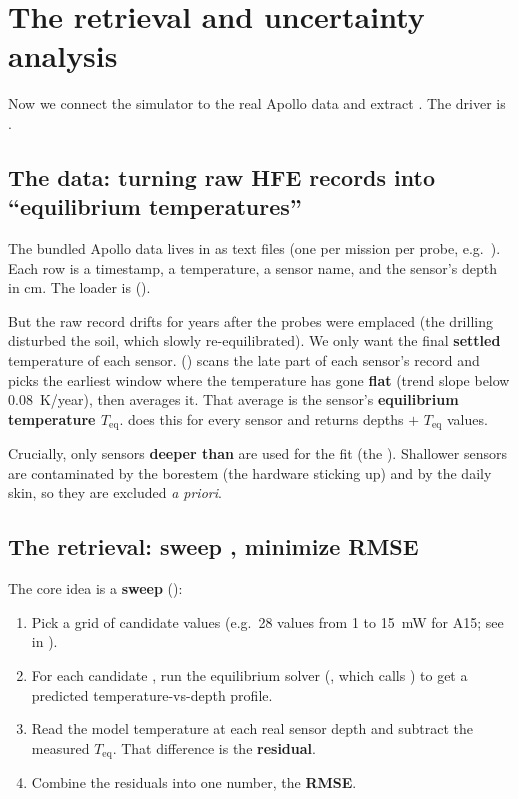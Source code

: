 \section{The \texorpdfstring{\Kd}{Kd} retrieval and uncertainty analysis}
\label{sec:retrieval}

Now we connect the simulator to the real Apollo data and extract \Kd. The driver
is .

\subsection{The data: turning raw HFE records into ``equilibrium temperatures''}
\label{sec:data}

The bundled Apollo data lives in  as  text
files (one per mission per probe, e.g.\ ). Each row is a
timestamp, a temperature, a sensor name, and the sensor's depth in cm. The loader
is  ().

But the raw record drifts for years after the probes were emplaced (the drilling
disturbed the soil, which slowly re-equilibrated). We only want the final
\textbf{settled} temperature of each sensor. 
() scans the late part of each sensor's record and
picks the earliest window where the temperature has gone \textbf{flat} (trend
slope below \SI{0.08}{K/year}), then averages it. That average is the sensor's
\textbf{equilibrium temperature $T_{\mathrm{eq}}$}. 
does this for every sensor and returns depths $+$ $T_{\mathrm{eq}}$ values.

Crucially, only sensors \textbf{deeper than } are
used for the fit (the ). Shallower sensors are contaminated by
the borestem (the hardware sticking up) and by the daily skin, so they are
excluded \emph{a priori}.

\subsection{The retrieval: sweep \texorpdfstring{\Kd}{Kd}, minimize RMSE}
\label{sec:sweep}

The core idea is a \textbf{sweep} ():
\begin{enumerate}[leftmargin=1.5em,itemsep=3pt]
  \item Pick a grid of candidate \Kd{} values (e.g.\ 28 values from 1 to
    \SI{15}{mW} for A15; see  in ).
  \item For each candidate \Kd{}, run the equilibrium solver (,
    which calls ) to get a predicted
    temperature-vs-depth profile.
  \item Read the model temperature at each real sensor depth and subtract the
    measured $T_{\mathrm{eq}}$. That difference is the \textbf{residual}.
  \item Combine the residuals into one number, the \textbf{RMSE}.
\end{enumerate}

